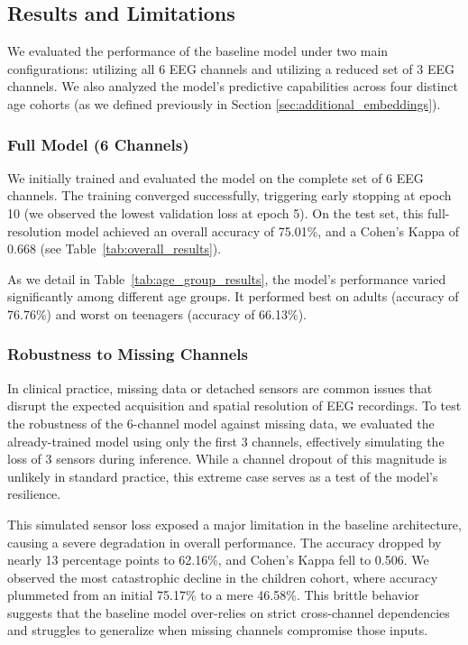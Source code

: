 \subsection{Results and Limitations}
We evaluated the performance of the baseline model under two main configurations: utilizing all 6 EEG channels and utilizing a reduced set of 3 EEG channels. We also analyzed the model's predictive capabilities across four distinct age cohorts (as we defined previously in Section \ref{sec:additional_embeddings}).

\subsubsection*{Full Model (6 Channels)}
We initially trained and evaluated the model on the complete set of 6 EEG channels. The training converged successfully, triggering early stopping at epoch 10 (we observed the lowest validation loss at epoch 5). On the test set, this full-resolution model achieved an overall accuracy of 75.01\%, and a Cohen's Kappa of 0.668 (see Table~\ref{tab:overall_results}). 

As we detail in Table~\ref{tab:age_group_results}, the model's performance varied significantly among different age groups. It performed best on adults (accuracy of 76.76\%) and worst on teenagers (accuracy of 66.13\%).

\subsubsection*{Robustness to Missing Channels}
In clinical practice, missing data or detached sensors are common issues that disrupt the expected acquisition and spatial resolution of EEG recordings. To test the robustness of the 6-channel model against missing data, we evaluated the already-trained model using only the first 3 channels, effectively simulating the loss of 3 sensors during inference. 
While a channel dropout of this magnitude is unlikely in standard practice, this extreme case serves as a test of the model's resilience.

This simulated sensor loss exposed a major limitation in the baseline architecture, causing a severe degradation in overall performance. The accuracy dropped by nearly 13 percentage points to 62.16\%, and Cohen's Kappa fell to 0.506. We observed the most catastrophic decline in the children cohort, where accuracy plummeted from an initial 75.17\% to a mere 46.58\%. This brittle behavior suggests that the baseline model over-relies on strict cross-channel dependencies and struggles to generalize when missing channels compromise those inputs.

